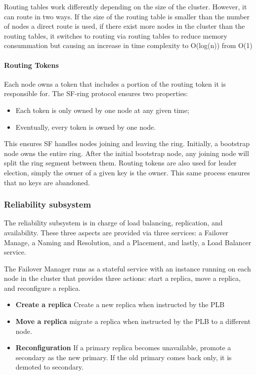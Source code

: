 \documentclass[a4paper,10pt,titlepage]{report}
\begin{document}
    Routing tables work differently depending on the size of the cluster. However, it can route in two ways. If the size of the routing table is smaller than the number of nodes a direct route is used, if there exist more nodes in the cluster than the routing tables, it switches to routing via routing tables to reduce memory consummation but causing an increase in time complexity to O(log(n)) from O(1)\\
    \vspace{5mm}
    \paragraph{Routing Tokens}
    
    Each node owns a token that includes a portion of the routing token it is responsible for. The SF-ring protocol ensures two properties:
    \begin{itemize}
        \item Each token is only owned by one node at any given time;
        \item Eventually, every token is owned by one node.
    \end{itemize}
    This ensures SF handles nodes joining and leaving the ring. Initially, a bootstrap node owns the entire ring. After the initial bootstrap node, any joining node will split the ring segment between them. Routing tokens are also used for leader election, simply the owner of a given key is the owner. This same process ensures that no keys are abandoned.

    \subsubsection{Reliability subsystem}
    The reliability subsystem is in charge of load balancing, replication, and availability. These three aspects are provided via three services: a Failover Manage, a Naming and Resolution, and a Placement, and lastly, a Load Balancer service.\\
    \vspace{5mm}

    The Failover Manager runs as a stateful service with an instance running on each node in the cluster that provides three actions: start a replica, move a replica, and reconfigure a replica.\\
    \vspace{5mm}

    \begin{itemize}
        \item \textbf{Create a replica} Create a new replica when instructed by the PLB
        \item \textbf{Move a replica} migrate a replica when instructed by the PLB to a different node.
        \item \textbf{Reconfiguration} If a primary replica becomes unavailable, promote a secondary as the new primary. If the old primary comes back only, it is demoted to secondary.
    \end{itemize}
\end{document}
